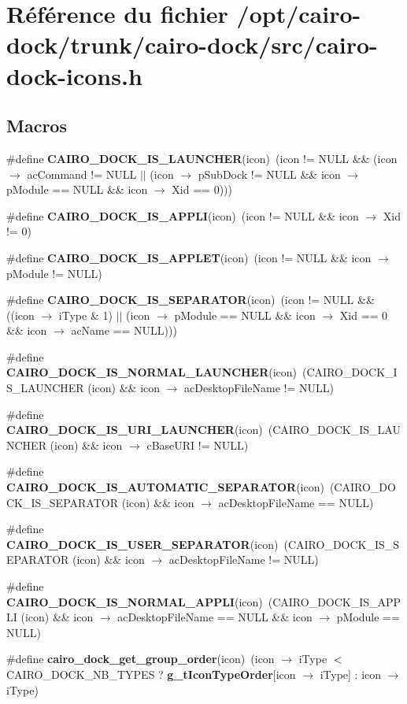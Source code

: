 \section{Référence du fichier /opt/cairo-dock/trunk/cairo-dock/src/cairo-dock-icons.h}
\label{cairo-dock-icons_8h}
\subsection*{Macros}
\begin{CompactItemize}
\item 
\#define {\bf CAIRO\_\-DOCK\_\-IS\_\-LAUNCHER}(icon)~(icon != NULL \&\& (icon $\rightarrow$ acCommand != NULL $|$$|$ (icon $\rightarrow$ pSubDock != NULL \&\& icon $\rightarrow$ pModule == NULL \&\& icon $\rightarrow$ Xid == 0)))
\item 
\#define {\bf CAIRO\_\-DOCK\_\-IS\_\-APPLI}(icon)~(icon != NULL \&\& icon $\rightarrow$ Xid != 0)
\item 
\#define {\bf CAIRO\_\-DOCK\_\-IS\_\-APPLET}(icon)~(icon != NULL \&\& icon $\rightarrow$ pModule != NULL)
\item 
\#define {\bf CAIRO\_\-DOCK\_\-IS\_\-SEPARATOR}(icon)~(icon != NULL \&\& ((icon $\rightarrow$ iType \& 1) $|$$|$ (icon $\rightarrow$ pModule == NULL \&\& icon $\rightarrow$ Xid == 0 \&\& icon $\rightarrow$ acName == NULL)))
\item 
\#define {\bf CAIRO\_\-DOCK\_\-IS\_\-NORMAL\_\-LAUNCHER}(icon)~(CAIRO\_\-DOCK\_\-IS\_\-LAUNCHER (icon) \&\& icon $\rightarrow$ acDesktopFileName != NULL)
\item 
\#define {\bf CAIRO\_\-DOCK\_\-IS\_\-URI\_\-LAUNCHER}(icon)~(CAIRO\_\-DOCK\_\-IS\_\-LAUNCHER (icon) \&\& icon $\rightarrow$ cBaseURI != NULL)
\item 
\#define {\bf CAIRO\_\-DOCK\_\-IS\_\-AUTOMATIC\_\-SEPARATOR}(icon)~(CAIRO\_\-DOCK\_\-IS\_\-SEPARATOR (icon) \&\& icon $\rightarrow$ acDesktopFileName == NULL)
\item 
\#define {\bf CAIRO\_\-DOCK\_\-IS\_\-USER\_\-SEPARATOR}(icon)~(CAIRO\_\-DOCK\_\-IS\_\-SEPARATOR (icon) \&\& icon $\rightarrow$ acDesktopFileName != NULL)
\item 
\#define {\bf CAIRO\_\-DOCK\_\-IS\_\-NORMAL\_\-APPLI}(icon)~(CAIRO\_\-DOCK\_\-IS\_\-APPLI (icon) \&\& icon $\rightarrow$ acDesktopFileName == NULL \&\& icon $\rightarrow$ pModule == NULL)
\item 
\#define {\bf cairo\_\-dock\_\-get\_\-group\_\-order}(icon)~(icon $\rightarrow$ iType $<$ CAIRO\_\-DOCK\_\-NB\_\-TYPES ? {\bf g\_\-tIconTypeOrder}[icon $\rightarrow$ iType] : icon $\rightarrow$ iType)

\end{CompactItemize}
